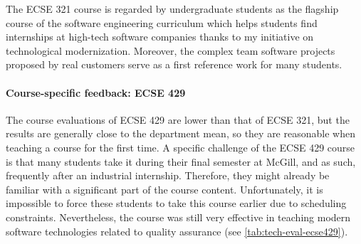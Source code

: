 The ECSE 321 course is regarded by undergraduate students as the flagship course of the software engineering curriculum which helps students find internships at high-tech software companies thanks to my initiative on technological modernization. Moreover, the complex team software projects proposed by real customers serve as a first reference work for many students.




\paragraph{Course-specific feedback: ECSE 429}
The course evaluations of ECSE 429 are lower than that of ECSE 321, but the results are generally close to the department 
mean, so they are reasonable when teaching a course for the first time.  A specific challenge of the ECSE 429 course is that 
many students take it during their final semester at McGill, and as such, frequently after an industrial 
internship. Therefore, they might already be familiar with a significant part of the course content. 
Unfortunately, it is impossible to force these students to take this course earlier due to scheduling constraints. Nevertheless, 
the course was still very effective in teaching modern software technologies related to quality assurance (see \autoref{tab:tech-eval-ecse429}).


